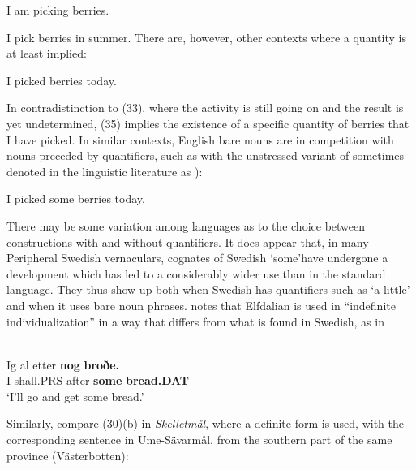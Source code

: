 
\ea
\gl \label{bkm:Ref78699401}I am picking berries.  
 \z

 \ea 
 \gl \label{bkm:Ref95014405}I pick berries in summer.
 \z 
There are, however, other contexts where a quantity is at least implied:

\ea
\gl \label{bkm:Ref78699451}I picked berries today. 
\z 

In contradistinction to (33), where the activity is still going on and the result is yet undetermined, (35) implies the existence of a specific quantity of berries that I have picked. In similar contexts, English bare nouns are in competition with nouns preceded by quantifiers, such as with the unstressed variant of  sometimes denoted in the linguistic literature as ):

\ea
\gl I picked some berries today.  
\z


There may be some variation among languages as to the choice between constructions with and without quantifiers. It does appear that, in many Peripheral Swedish vernaculars, cognates of Swedish  ‘some’\textstyleLinguisticExample{ }have undergone a development which has led to a considerably wider use than in the standard language. They thus show up both when Swedish has quantifiers such as  ‘a little’ and when it uses bare noun phrases. \citet[110]{Levander1909} notes that Elfdalian is used in “indefinite individualization” in a way that differs from what is found in Swedish, as in 


\ea \label{} 
\\
\gll Ig  al  etter  \textbf{nog} \textbf{  broðe.}\\
I  shall.PRS  after  \textbf{some} \textbf{bread.DAT}\\
\glt ‘I’ll go and get some bread.’ 

\z

Similarly, compare (30)(b) in \textit{Skelletmål}, where a definite form  is used, with the corresponding sentence in Ume-Sävarmål, from the southern part of the same province (Västerbotten):

